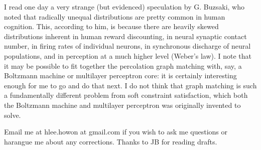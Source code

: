 \documentclass[12pt]{article}
\begin{document}
I read one day a very strange (but evidenced) speculation by G. Buzsaki, who noted that radically unequal distributions are pretty common in human cognition. This, according to him, is because there are heavily skewed distributions inherent in human reward discounting, in neural synaptic contact number, in firing rates of individual neurons, in synchronous discharge of neural populations, and in perception at a much higher level (Weber's law). I note that it may be possible to fit together the percolation graph matching with, say, a Boltzmann machine or multilayer perceptron core: it is certainly interesting enough for me to go and do that next. I do not think that graph matching is such a fundamentally different problem from soft constraint satisfaction, which both the Boltzmann machine and multilayer perceptron was originally invented to solve.

Email me at hlee.howon at gmail.com if you wish to ask me questions or harangue me about any corrections. Thanks to JB for reading drafts.
\end{document}
